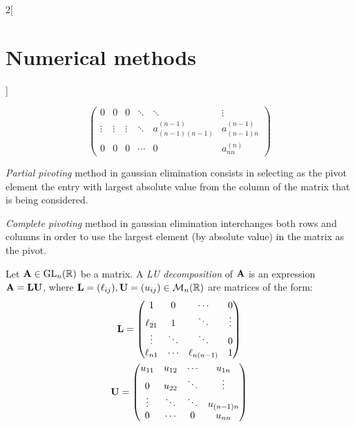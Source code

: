 \documentclass[../../../main_math.tex]{subfiles}
\begin{document}
\begin{multicols}{2}[\section{Numerical methods}]
\begin{proposition}
$$\begin{pmatrix}
        0            & 0            & 0            & \ddots       & \ddots                 & \vdots             \\
        \vdots       & \vdots       & \vdots       & \ddots       & a_{(n-1)(n-1)}^{(n-1)} & a_{(n-1)n}^{(n-1)} \\
        0            & 0            & 0            & \cdots       & 0                      & a_{nn}^{(n)}
      \end{pmatrix}
    $$
  \end{proposition}
  \begin{proposition}
    \emph{Partial pivoting} method in gaussian elimination consists in selecting as the pivot element the entry with largest absolute value from the column of the matrix that is being considered.
  \end{proposition}
  \begin{proposition}
    \emph{Complete pivoting} method in gaussian elimination interchanges both rows and columns in order to use the largest element (by absolute value) in the matrix as the pivot.
  \end{proposition}
  \begin{definition}[LU descompostion]
    Let $\boldsymbol{\mathrm{A}}\in\mathrm{GL}_n(\mathbb{R})$ be a matrix. A \emph{LU decomposition} of $\boldsymbol{\mathrm{A}}$ is an expression $\boldsymbol{\mathrm{A}}=\boldsymbol{\mathrm{L}}\boldsymbol{\mathrm{U}}$, where $\boldsymbol{\mathrm{L}}=(\ell_{ij}),\boldsymbol{\mathrm{U}}=(u_{ij})\in\mathcal{M}_n(\mathbb{R})$ are matrices of the form:
    \begin{gather}\label{NM:L}
      \boldsymbol{\mathrm{L}}=
      \begin{pmatrix}
        1         & 0      & \cdots        & 0      \\
        \ell_{21} & 1      & \ddots        & \vdots \\
        \vdots    & \ddots & \ddots        & 0      \\
        \ell_{n1} & \cdots & \ell_{n(n-1)} & 1
      \end{pmatrix}\\\label{NM:U}
      \boldsymbol{\mathrm{U}}=
      \begin{pmatrix}
        u_{11} & u_{12} & \cdots & u_{1n}     \\
        0      & u_{22} & \ddots & \vdots     \\
        \vdots & \ddots & \ddots & u_{(n-1)n} \\
        0      & \cdots & 0      & u_{nn}
      \end{pmatrix}
    \end{gather}
  \end{definition}

\end{multicols}
\end{document}
